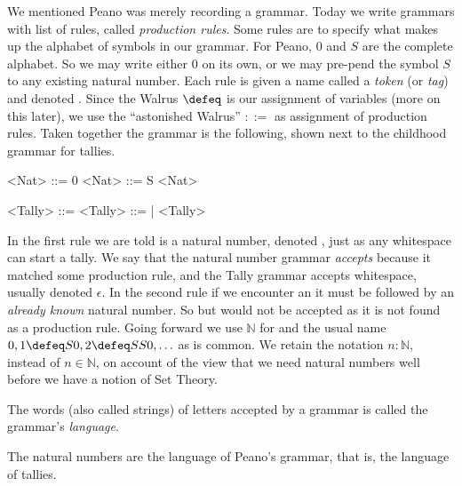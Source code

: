 We mentioned Peano was merely recording a grammar.  Today we write grammars with
list of rules, called \emph{production rules}.  Some rules are to specify what
makes up the alphabet of symbols in our grammar.  For Peano, $0$ and $S$ are the
complete alphabet.  So we may write either $0$ on its own, or we may pre-pend
the symbol $S$ to any existing natural number.  Each rule is given a name called
a \emph{token} (or \emph{tag}) and denoted . Since the Walrus
$\defeq$ is our assignment of variables (more on this later), we use the
``astonished Walrus'' $::=$ as assignment of production rules.   Taken together
the grammar is the following, shown next to the childhood grammar for tallies.
\begin{center}
\begin{minipage}{0.4\textwidth}
\begin{Gcode}[]
<Nat> ::= 0 
<Nat> ::= S <Nat>
\end{Gcode}
\end{minipage}
\hfill
\begin{minipage}{0.45\textwidth}
\begin{Gcode}[]
<Tally> ::=  
<Tally> ::= | <Tally>
\end{Gcode}
\end{minipage}
\end{center}
In the first rule we are told  is a natural number, denoted
, just as any whitespace can start a tally. We say that the natural
number grammar \emph{accepts}  because it matched some production rule,
and the Tally grammar accepts whitespace, usually denoted $\epsilon$.  In the
second rule if we encounter an  it must be followed by an \emph{already
known} natural number.  So  but  would not be accepted as
it is not found as a production rule.  Going forward we use $\mathbb{N}$ 
for  and the usual name $0,1\defeq S0, 2\defeq SS0,\ldots$ as is common.
We retain the notation $n:\mathbb{N}$, instead of $n\in \mathbb{N}$, on account 
of the view that we need natural numbers well before we have a notion of Set Theory.

\begin{definition}
    The words (also called strings) of letters accepted by a grammar is called
    the grammar's \emph{language}.
\end{definition}

\begin{example}
The natural numbers are the language of Peano's grammar, that is, the language of tallies.
\end{example}

